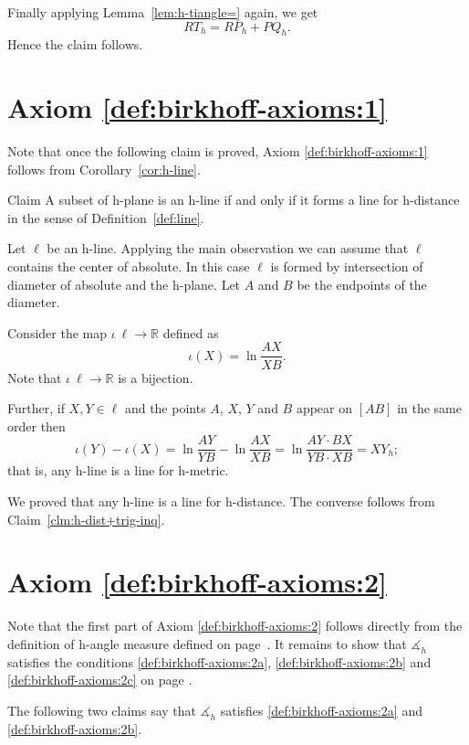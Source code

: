 Finally applying Lemma~\ref{lem:h-tiangle=} again, we get $$RT_h=RP_h+PQ_h.$$
Hence the claim follows.
\qeds

\section*{Axiom \ref{def:birkhoff-axioms:1}}

Note that once the following claim is proved,
Axiom \ref{def:birkhoff-axioms:1} 
follows from Corollary~\ref{cor:h-line}.

\begin{thm}{Claim}
A subset of h-plane is an h-line if and only if it forms a line for h-distance in the sense of Definition~\ref{def:line}.
\end{thm}

Let $\ell$ be an h-line.
Applying the main observation we can assume that $\ell$ contains the center of absolute.
In this case $\ell$ is formed by intersection of diameter of absolute and the h-plane.
Let $A$ and $B$ be the endpoints of the diameter.

Consider the map $\iota\:\ell\to \mathbb{R}$ defined as
$$\iota(X)=\ln \frac{AX}{XB}.$$
Note that $\iota\:\ell\to \mathbb{R}$ is a bijection.

Further, if $X,Y\in \ell$ and the points $A$, $X$, $Y$ and $B$ appear on $[AB]$ in the same order then
\[\iota(Y)-\iota(X)=\ln \frac{AY}{YB}-\ln \frac{AX}{XB}=\ln \frac{AY\cdot BX}{YB\cdot XB}=XY_h;\]
that is, any h-line is a line for h-metric.

We proved that any h-line is a line for h-distance.
The converse follows from Claim~\ref{clm:h-dist+trig-inq}.
\qeds


\section*{Axiom \ref{def:birkhoff-axioms:2}}

Note that the first part of Axiom \ref{def:birkhoff-axioms:2} follows directly from the definition of h-angle measure defined on page~\pageref{h-angle measure}.
It remains to show that $\measuredangle_h$ satisfies the conditions \ref{def:birkhoff-axioms:2a}, \ref{def:birkhoff-axioms:2b} and \ref{def:birkhoff-axioms:2c} on page \pageref{def:birkhoff-axioms:2b}.

The following two claims say that
$\measuredangle_h$ satisfies
 \ref{def:birkhoff-axioms:2a} and \ref{def:birkhoff-axioms:2b}.

